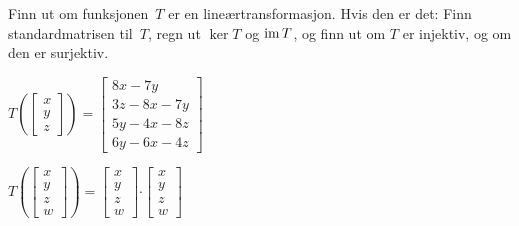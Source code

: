 


\begin{oppgave}
Finn ut om funksjonen~$T$ er en lineærtransformasjon.  Hvis den er
det: Finn standardmatrisen til~$T$, regn ut $\ker T$ og $\operatorname{im} T$, og
finn ut om $T$ er injektiv, og om den er surjektiv.
\begin{punkt}
$T\left( \begin{bmatrix}
x\\
y\\
z
\end{bmatrix} \right)=\begin{bmatrix}
8x-7y\\
3z-8x-7y\\
5y-4x-8z\\
6y-6x-4z
\end{bmatrix}$
\end{punkt}

\begin{punkt}
$T\left( \begin{bmatrix}
x\\
y\\
z\\
w
\end{bmatrix} \right)=\begin{bmatrix}
x\\
y\\
z\\
w
\end{bmatrix}\boldsymbol{\cdot }\begin{bmatrix}
x\\
y\\
z\\
w
\end{bmatrix}$
\end{punkt}


\end{oppgave}
